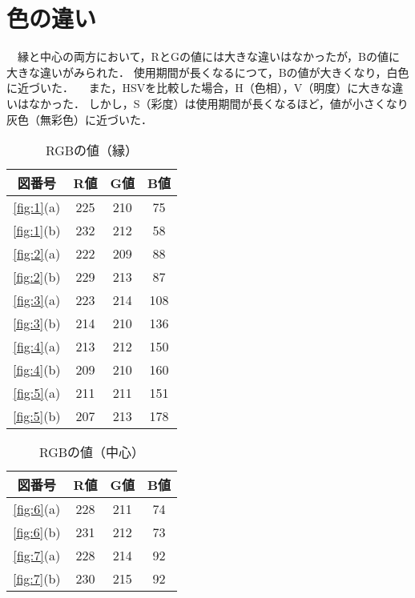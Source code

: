 \documentclass[main]{subfiles}
\begin{document}
\section{色の違い}

　縁と中心の両方において，RとGの値には大きな違いはなかったが，Bの値に大きな違いがみられた．
使用期間が長くなるにつて，Bの値が大きくなり，白色に近づいた．
　また，HSVを比較した場合，H（色相），V（明度）に大きな違いはなかった．
しかし，S（彩度）は使用期間が長くなるほど，値が小さくなり灰色（無彩色）に近づいた．


\begin{table}[h]
    \caption{RGBの値（縁）}
    \label{table:RGB1}
    \centering
\begin{tabular}{c|c|c|c}
    図番号 & R値 & G値 & B値 \\ \hline
    \ref{fig:1}(a) & 225 & 210 & 75 \\ \hline
   \ref{fig:1}(b) & 232 & 212 & 58 \\ \hline\hline
   \ref{fig:2}(a) & 222 & 209 & 88 \\ \hline
   \ref{fig:2}(b) & 229 & 213 & 87 \\ \hline
   \ref{fig:3}(a) & 223 & 214 & 108 \\ \hline
   \ref{fig:3}(b) & 214 & 210 & 136 \\ \hline\hline
   \ref{fig:4}(a) & 213 & 212 & 150 \\ \hline
   \ref{fig:4}(b) & 209 & 210 & 160 \\ \hline
   \ref{fig:5}(a) & 211 & 211 & 151 \\ \hline
   \ref{fig:5}(b) & 207 & 213 & 178 \\ 
\end{tabular}    
\end{table}

\begin{table}[h]
    \caption{RGBの値（中心）}
    \label{table:RGB2}
    \centering
\begin{tabular}{c|c|c|c}
    図番号 & R値 & G値 & B値 \\ \hline
   \ref{fig:6}(a) & 228 & 211 & 74 \\ \hline
   \ref{fig:6}(b) & 231 & 212 & 73 \\ \hline\hline
   \ref{fig:7}(a) & 228 & 214 & 92 \\ \hline
   \ref{fig:7}(b) & 230 & 215 & 92 \\ 
\end{tabular}    
\end{table}
\end{document}
